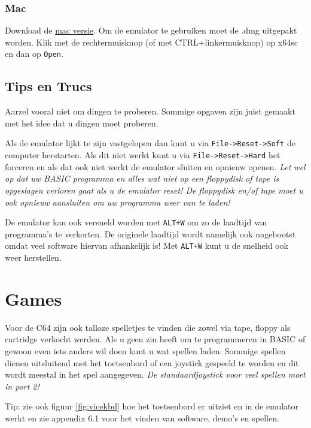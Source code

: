 \documentclass{article}
\begin{document}
\subsubsection{Mac}
Download de \href{http://sourceforge.net/projects/vice-emu/files/releases/binaries/macosx/vice-macosx-cocoa-x86_64-10.12-3.1.dmg/download}{mac versie}.
Om de emulator te gebruiken moet de .dmg uitgepakt worden.
Klik met de rechtermuisknop (of met CTRL+linkermuisknop) op x64sc en dan op \verb:Open:.

\subsection{Tips en Trucs}

Aarzel vooral niet om dingen te proberen.
Sommige opgaven zijn juist gemaakt met het idee dat u dingen moet proberen.

Als de emulator lijkt te zijn vastgelopen dan kunt u via \verb:File->Reset->Soft: de computer herstarten.
Als dit niet werkt kunt u via \verb:File->Reset->Hard: het forceren en als dat ook niet werkt de emulator sluiten en opnieuw openen.
\emph{Let wel op dat uw BASIC programma en alles wat niet op een floppydisk of tape is opgeslagen verloren gaat als u de emulator reset!
De floppydisk en/of tape moet u ook opnieuw aansluiten om uw programma weer van te laden!}

De emulator kan ook versneld worden met \verb:ALT+W: om zo de laadtijd van programma's te verkorten.
De originele laadtijd wordt namelijk ook nagebootst omdat veel software hiervan afhankelijk is!
Met \verb:ALT+W: kunt u de snelheid ook weer herstellen.

\section{Games}

Voor de C64 zijn ook talloze spelletjes te vinden die zowel via tape, floppy als cartridge verkocht werden.
Als u geen zin heeft om te programmeren in BASIC of gewoon even iets anders wil doen kunt u wat spellen laden.
Sommige spellen dienen uitsluitend met het toetsenbord of een joystick gespeeld te worden en dit wordt meestal in het spel aangegeven.
\emph{De standaardjoystick voor veel spellen moet in port 2!}

Tip: zie ook figuur \ref{fig:vicekbd} hoe het toetsenbord er uitziet en in de emulator werkt en zie appendix 6.1 voor het vinden van software, demo's en spellen.


\end{document}
